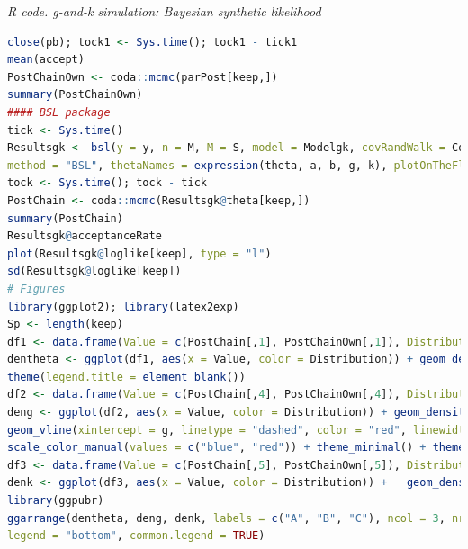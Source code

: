 \begin{tcolorbox}[enhanced,width=4.67in,center upper,
	fontupper=\large\bfseries,drop shadow southwest,sharp corners]
	\textit{R code. g-and-k simulation: Bayesian synthetic likelihood}
	\begin{VF}
		\begin{lstlisting}[language=R]
close(pb); tock1 <- Sys.time(); tock1 - tick1
mean(accept)
PostChainOwn <- coda::mcmc(parPost[keep,])
summary(PostChainOwn)
#### BSL package
tick <- Sys.time()
Resultsgk <- bsl(y = y, n = M, M = S, model = Modelgk, covRandWalk = CoVarRW,
method = "BSL", thetaNames = expression(theta, a, b, g, k), plotOnTheFly = TRUE)
tock <- Sys.time(); tock - tick
PostChain <- coda::mcmc(Resultsgk@theta[keep,])
summary(PostChain)
Resultsgk@acceptanceRate
plot(Resultsgk@loglike[keep], type = "l")
sd(Resultsgk@loglike[keep])
# Figures 
library(ggplot2); library(latex2exp)
Sp <- length(keep)
df1 <- data.frame(Value = c(PostChain[,1], PostChainOwn[,1]), Distribution = factor(c(rep("BSL", Sp), rep("BSLscratch", Sp))))
dentheta <- ggplot(df1, aes(x = Value, color = Distribution)) + geom_density(linewidth = 1) + labs(title = TeX("Posterior density plot: $theta$"), x = TeX("$theta$"), y = "Posterior density") + geom_vline(xintercept = theta1, linetype = "dashed", color = "red", linewidth = 1) + scale_color_manual(values = c("blue", "red")) +  theme_minimal() +
theme(legend.title = element_blank())
df2 <- data.frame(Value = c(PostChain[,4], PostChainOwn[,4]), Distribution = factor(c(rep("BSL", Sp), rep("BSLscratch", Sp))))
deng <- ggplot(df2, aes(x = Value, color = Distribution)) + geom_density(linewidth = 1) + labs(title = "Posterior density plot: g", x = "g", y = "Posterior density") +
geom_vline(xintercept = g, linetype = "dashed", color = "red", linewidth = 1) +
scale_color_manual(values = c("blue", "red")) + theme_minimal() + theme(legend.title = element_blank())
df3 <- data.frame(Value = c(PostChain[,5], PostChainOwn[,5]), Distribution = factor(c(rep("BSL", Sp), rep("BSLscratch", Sp))))
denk <- ggplot(df3, aes(x = Value, color = Distribution)) +   geom_density(linewidth = 1) + labs(title = "Posterior density plot: k", x = "k", y = "Posterior density") + geom_vline(xintercept = k, linetype = "dashed", color = "red", linewidth = 1) + scale_color_manual(values = c("blue", "red")) +  theme_minimal() + theme(legend.title = element_blank())
library(ggpubr)
ggarrange(dentheta, deng, denk, labels = c("A", "B", "C"), ncol = 3, nrow = 1,
legend = "bottom", common.legend = TRUE)
\end{lstlisting}
	\end{VF}
\end{tcolorbox}

